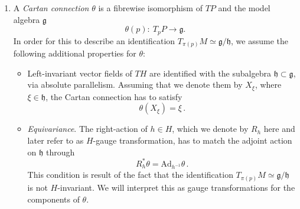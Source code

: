 \documentclass[11pt,a4paper]{article}
\numberwithin{equation}{section}
\newcommand{\commentO}[1]{ {\color{blue}  [{\bf O: #1}]}}
\begin{document}
\begin{enumerate}
\begin{itemize}
        \item A $d$-dimensional (coset) model space $\frac{G}{H}$, formed by a (reductive) quotient of the Lie group $G$ and $H$. For the presentation here, only its Lie algebra $\mathfrak{g}$, which we will dub \textit{model algebra} in the following, is relevant. In the prototypical example where $H$ is the group of rotations or the Lorentz group, the model algebra $\mathfrak{g}$ would be the Euclidean or Poincar\'e algebra, where $\mathfrak{g} = \mathbb{R}^d \rtimes  \mathfrak{o}(d)$ (or $\mathfrak{g} = \mathbb{R}^{d} \rtimes  \mathfrak{o}(1,d-1)$).
    \end{itemize}
    \item A \textit{Cartan connection} $\theta$ is a fibrewise isomorphism of $TP$ and the model algebra $\mathfrak{g}$
    \begin{equation}
        \theta(p): \ T_p P \rightarrow \mathfrak{g}. \label{eq:CartanConnectionDefinition}
    \end{equation}
    In order for this to describe an identification $T_{\pi(p)} M \simeq \mathfrak{g}/\mathfrak{h}$, we assume the following additional properties for $\theta$:
   \begin{itemize}
        \item Left-invariant vector fields of $TH$ are identified with the subalgebra $\mathfrak{h} \subset \mathfrak{g}$, via absolute parallelism. Assuming that we denote them by $X_\xi$, where $\xi\in\mathfrak{h}$, the Cartan connection has to satisfy
        \begin{equation}\label{eq:NormalCartanIdentity}
            \theta(X_\xi) = \xi\,.
        \end{equation}
        \item \textit{Equivariance}. The right-action of $h \in H$, which we denote by $R_h$ here and later refer to as $H$-gauge transformation, has to match the adjoint action on $\mathfrak{h}$ through
        \begin{equation}
            R^*_h \theta = \mathrm{Ad}_{h^{-1}} \theta\,. \label{eq:Equivariance}
        \end{equation}
        This condition is result of the fact that the identification $T_{\pi(p)} M \simeq \mathfrak{g}/\mathfrak{h}$ is not $H$-invariant. We will interpret this as gauge transformations for the components of $\theta$. 

\end{itemize}
\end{enumerate}
\end{document}
